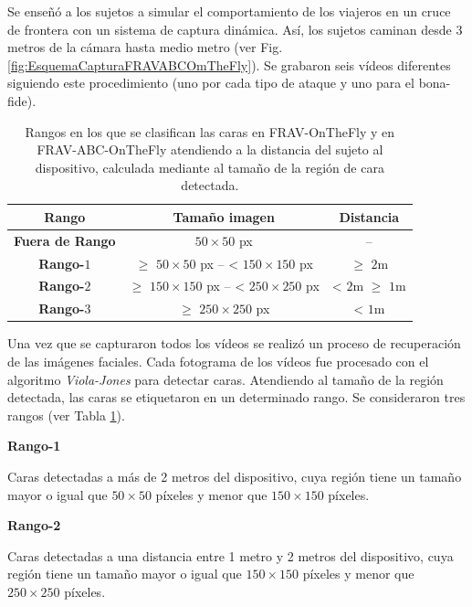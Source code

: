 Se enseñó a los sujetos a simular el comportamiento de los viajeros en un cruce de frontera con un sistema  de captura dinámica. Así, los sujetos caminan desde 3 metros de la cámara hasta medio metro (ver Fig. \ref{fig:EsquemaCapturaFRAVABCOmTheFly}). Se grabaron seis vídeos diferentes siguiendo este procedimiento (uno por cada tipo de ataque y uno para el \gls{bona-fide}). 

\begin{table}
\centering
\begin{tabular}{|c|c|c|}
\hline
\textbf{Rango} & \textbf{Tamaño imagen} & \textbf{Distancia} \\ \hline
\textbf{Fuera de Rango} & $50\times50$ px & -- \\ \hline
\textbf{Rango-$1$} & $\geq{}$ $50\times50$ px -- \textless{} $150\times150$ px & $\geq{}$ $2$m \\ \hline
\textbf{Rango-$2$} & $\geq{}$ $150\times150$ px -- \textless{} $250\times250$ px & \textless{} $2$m $\geq{}$ $1$m \\ \hline
\textbf{Rango-$3$} & $\geq{}$ $250\times250$ px & \textless{} $1$m \\ \hline
\end{tabular}
\caption{Rangos en los que se clasifican las caras en \Gls{FRAV-OnTheFly} y en \Gls{FRAV-ABC-OnTheFly} atendiendo a la distancia del sujeto al dispositivo, calculada mediante al tamaño de la región de cara detectada.}
\label{tab:facesranges_FRAV_OnTheFly}
\end{table}

Una vez que se capturaron todos los vídeos se realizó un proceso de recuperación de las imágenes faciales. Cada fotograma de los vídeos fue procesado con el algoritmo \textit{\gls{Viola-Jones}} \cite{viola2004robust} para detectar caras. Atendiendo al tamaño de la región detectada, las caras se etiquetaron en un determinado rango. Se consideraron tres rangos (ver Tabla \ref{tab:facesranges_FRAV_OnTheFly}). 

\medskip
\textbf{Rango-1}

Caras detectadas a más de 2 metros del dispositivo, cuya región tiene un tamaño mayor o igual que $50\times50$ píxeles y menor que $150\times150$ píxeles.

\medskip
\textbf{Rango-2}

Caras detectadas a una distancia entre 1 metro y 2 metros del dispositivo, cuya región tiene un tamaño mayor o igual que $150\times150$ píxeles y menor que $250\times250$ píxeles.


